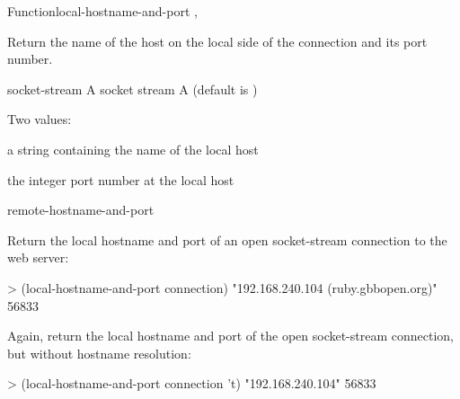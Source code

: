 \documentclass[10pt,twoside,english,pdftex]{article}
\begin{document}
\begin{functiondoc}{Function}{local-hostname-and-port}%
  {   
  \returns{} , }
%
%
%
%

\fnsyntax

\fnpurpose Return the name of the host on the local side of the
 connection and its port number.

\fnpackage {}

\fnmodule {}

\fnargs
\begin{args}{socket-stream}
 A socket stream
 A  (default is \nil)
\end{args}

\fnreturns Two values:
\begin{tightitemize}
\item a string containing the name of the local host
\item the integer port number at the local host
\end{tightitemize}

\begin{alsos}{remote-hostname-and-port}
\end{alsos}

\fnexamples
Return the local hostname and port of an open socket-stream
connection to the  web server:
\begin{example}
> (local-hostname-and-port connection)
"192.168.240.104 (ruby.gbbopen.org)"
56833
\end{example}

Again, return the local hostname and port of the open socket-stream
connection, but without hostname resolution:
\begin{example}
> (local-hostname-and-port connection 't)
"192.168.240.104"
56833
\end{example}

\end{functiondoc}

\end{document}
